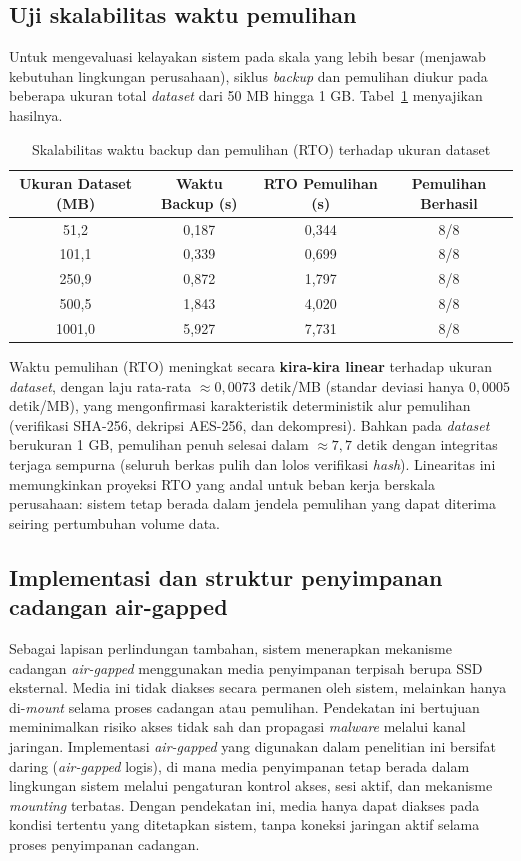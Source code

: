 \documentclass{iaesarticle}
\begin{document}
\subsection{Uji skalabilitas waktu pemulihan}
Untuk mengevaluasi kelayakan sistem pada skala yang lebih besar (menjawab kebutuhan lingkungan perusahaan), siklus \textit{backup} dan pemulihan diukur pada beberapa ukuran total \textit{dataset} dari 50 MB hingga 1 GB. Tabel~\ref{tab:scalability} menyajikan hasilnya.

\begin{table}[H]
\centering
\fontsize{8pt}{10pt}\selectfont
\caption{Skalabilitas waktu backup dan pemulihan (RTO) terhadap ukuran dataset}
\label{tab:scalability}
\begin{tabular}{c c c c}
\hline
\textbf{Ukuran Dataset (MB)} & \textbf{Waktu Backup (s)} & \textbf{RTO Pemulihan (s)} & \textbf{Pemulihan Berhasil} \\
\hline
51,2   & 0,187 & 0,344 & 8/8 \\
101,1  & 0,339 & 0,699 & 8/8 \\
250,9  & 0,872 & 1,797 & 8/8 \\
500,5  & 1,843 & 4,020 & 8/8 \\
1001,0 & 5,927 & 7,731 & 8/8 \\
\hline
\end{tabular}
\end{table}

Waktu pemulihan (RTO) meningkat secara \textbf{kira-kira linear} terhadap ukuran \textit{dataset}, dengan laju rata-rata $\approx 0{,}0073$ detik/MB (standar deviasi hanya $0{,}0005$ detik/MB), yang mengonfirmasi karakteristik deterministik alur pemulihan (verifikasi SHA-256, dekripsi AES-256, dan dekompresi). Bahkan pada \textit{dataset} berukuran 1 GB, pemulihan penuh selesai dalam $\approx 7{,}7$ detik dengan integritas terjaga sempurna (seluruh berkas pulih dan lolos verifikasi \textit{hash}). Linearitas ini memungkinkan proyeksi RTO yang andal untuk beban kerja berskala perusahaan: sistem tetap berada dalam jendela pemulihan yang dapat diterima seiring pertumbuhan volume data.

\subsection{Implementasi dan struktur penyimpanan cadangan air-gapped}
Sebagai lapisan perlindungan tambahan, sistem menerapkan mekanisme cadangan \textit{air-gapped} menggunakan media penyimpanan terpisah berupa SSD eksternal. Media ini tidak diakses secara permanen oleh sistem, melainkan hanya di-\textit{mount} selama proses cadangan atau pemulihan. Pendekatan ini bertujuan meminimalkan risiko akses tidak sah dan propagasi \textit{malware} melalui kanal jaringan. Implementasi \textit{air-gapped} yang digunakan dalam penelitian ini bersifat daring (\textit{air-gapped} logis), di mana media penyimpanan tetap berada dalam lingkungan sistem melalui pengaturan kontrol akses, sesi aktif, dan mekanisme \textit{mounting} terbatas. Dengan pendekatan ini, media hanya dapat diakses pada kondisi tertentu yang ditetapkan sistem, tanpa koneksi jaringan aktif selama proses penyimpanan cadangan.
\end{document}

